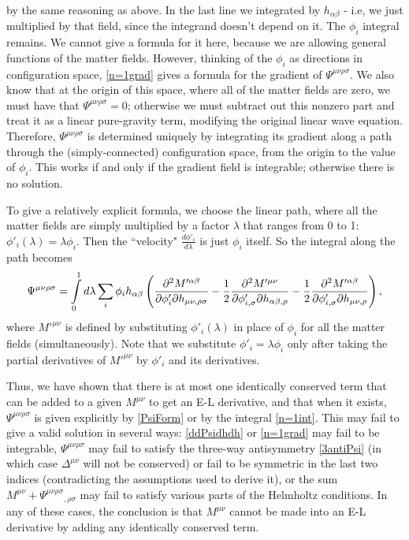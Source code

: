 \documentclass[aps,physrev,preprint,groupedaddress]{revtex4-2}
\begin{document}
by the same reasoning as above. In the last line we integrated by \(h_{\alpha\beta}\) - i.e, we just multiplied by that field, since the integrand doesn't depend on it. The \(\phi_i\) integral remains. We cannot give a formula for it here, because we are allowing general functions of the matter fields. However, thinking of the \({\phi_i}\) as directions in configuration space, \ref{n=1grad} gives a formula for the gradient of \(\Psi^{\mu\nu\rho\sigma}\). We also know that at the origin of this space, where all of the matter fields are zero, we must have that \(\Psi^{\mu\nu\rho\sigma}=0\); otherwise we must subtract out this nonzero part and treat it as a linear pure-gravity term, modifying the original linear wave equation. Therefore, \(\Psi^{\mu\nu\rho\sigma}\) is determined uniquely by integrating its gradient along a path through the (simply-connected) configuration space, from the origin to the value of \({\phi_i}\). This works if and only if the gradient field is integrable; otherwise there is no solution.

To give a relatively explicit formula, we choose the linear path, where all the matter fields are simply multiplied by a factor \(\lambda\) that ranges from 0 to 1: \(\phi'_i(\lambda)=\lambda\phi_i\). Then the ``velocity" \(\frac{d\phi'_i}{d\lambda}\) is just \(\phi_i\) itself. So the integral along the path becomes
\begin{equation}\label{n=1int}
\Psi^{\mu\nu\rho\sigma}=\intop_0^1d\lambda\sum_i\phi_ih_{\alpha\beta}\left(\frac{\partial^2 M'^{\alpha\beta}}{\partial\phi'_i\partial h_{\mu\nu,\rho\sigma}}-\frac{1}{2}\frac{\partial^2 M'^{\mu\nu}}{\partial\phi'_{i,\sigma} \partial h_{\alpha\beta,\rho}}-\frac{1}{2}\frac{\partial^2 M'^{\alpha\beta}}{\partial\phi'_{i,\sigma} \partial h_{\mu\nu,\rho}}\right),
\end{equation}
where \(M'^{\mu\nu}\) is defined by substituting \(\phi'_i(\lambda)\) in place of \(\phi_i\) for all the matter fields (simultaneously). Note that we substitute \(\phi'_i=\lambda\phi_i\) only after taking the partial derivatives of \(M'^{\mu\nu}\) by \(\phi'_i\) and its derivatives. 

Thus, we have shown that there is at most one identically conserved term that can be added to a given \(M^{\mu\nu}\) to get an E-L derivative, and that when it exists, \(\Psi^{\mu\nu\rho\sigma}\) is given explicitly by \eqref{PsiForm} or by the integral \eqref{n=1int}. This may fail to give a valid solution in several ways: \eqref{ddPsidhdh} or \eqref{n=1grad} may fail to be integrable, \(\Psi^{\mu\nu\rho\sigma}\) may fail to satisfy the three-way antisymmetry \eqref{3antiPsi} (in which case \(\Delta^{\mu\nu}\) will not be conserved) or fail to be symmetric in the last two indices (contradicting the assumptions used to derive it), or the sum \(M^{\mu\nu}+ \Psi^{\mu\nu\rho\sigma}{}_{,\rho\sigma}\) may fail to satisfy various parts of the Helmholtz conditions. In any of these cases, the conclusion is that \(M^{\mu\nu}\) cannot be made into an E-L derivative by adding any identically conserved term. 
\end{document}
